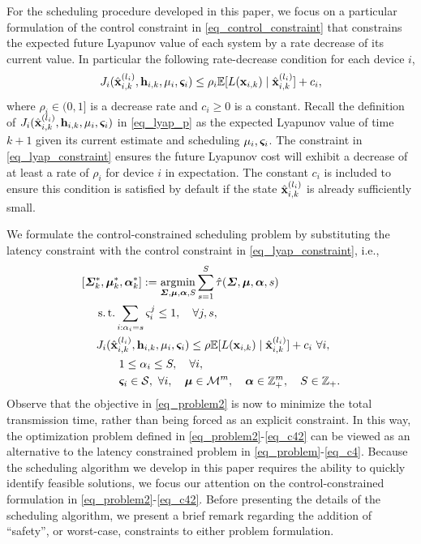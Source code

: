 For the scheduling procedure developed in this paper, we focus on a particular formulation of the control constraint in \eqref{eq_control_constraint} that constrains the expected future Lyapunov value of each system by a rate decrease of its current value. In particular the following rate-decrease condition for each device $i$,
%
\begin{align}\label{eq_lyap_constraint}
J_i(\hbx^{(l_i)}_{i,k},\bbh_{i,k},\mu_i,\bbsigma_i) \leq \rho_i \E [L(\bbx_{i,k}) \mid \hbx^{(l_i)}_{i,k}] + c_i,
\end{align}
%
where $\rho_i \in (0,1]$ is a decrease rate and $c_i \geq 0$ is a constant. Recall the definition of $J_i({\hat{\mathbf x} }^{(l_i)}_{i,k},{\mathbf h}_{i,k},\mu_i,\boldsymbol{\varsigma}_i)$ in \eqref{eq_lyap_p} as the expected Lyapunov value of time $k+1$ given its current estimate and scheduling $\mu_i, \boldsymbol{\varsigma}_i$. The constraint in \eqref{eq_lyap_constraint} ensures the future Lyapunov cost will exhibit a decrease of at least a rate of $\rho_i$ for device $i$ in expectation. The constant $c_i$ is included to ensure this condition is satisfied by default if the state ${\hat{\mathbf x} }^{(l_i)}_{i,k}$ is already sufficiently small. 

We formulate the control-constrained scheduling problem by substituting the latency constraint with the control constraint in \eqref{eq_lyap_constraint}, i.e.,
%
\begin{align}\label{eq_problem2}
[&\bbSigma_k^*, \bbmu_k^*,\bbalpha_k^*]  := \argmin_{\bbSigma, \bbmu, \bbalpha, S} \sum_{s=1}^S \hat{\tau}(\bbSigma, \bbmu, \bbalpha, s) \\
& \quad \st \sum_{i: \alpha_i = s} \varsigma_{i}^j \leq 1, \quad \forall j, s, \label{eq_c12} \\
& \quad   J_i(\hbx^{(l_i)}_{i,k},\bbh_{i,k},\mu_i,\bbsigma_i) \leq \rho \E [L(\bbx_{i,k}) \mid \hbx^{(l_i)}_{i,k}] + c_i \ \forall i, \label{eq_c22}\\
& \qquad \quad 1 \leq \alpha_i \leq S, \quad \forall i, \label{eq_c32}\\
& \qquad \quad \bbsigma_i \in \ccalS, \ \forall i, \quad \bbmu \in \ccalM^m, \quad \bbalpha \in \mathbb{Z}_+^m, \quad S \in \mathbb{Z}_+. \label{eq_c42}
\end{align}
%
Observe that the objective in \eqref{eq_problem2} is now to minimize the total transmission time, rather than being forced as an explicit constraint. In this way, the optimization problem defined in 
\eqref{eq_problem2}-\eqref{eq_c42} can be viewed as an alternative to the latency constrained problem in \eqref{eq_problem}-\eqref{eq_c4}. Because the scheduling algorithm we develop in this paper requires the ability to quickly identify feasible solutions, we focus our attention on the control-constrained formulation in \eqref{eq_problem2}-\eqref{eq_c42}. Before presenting the details of the scheduling algorithm, we present a brief remark regarding the  addition of ``safety'', or worst-case, constraints to either problem formulation.

